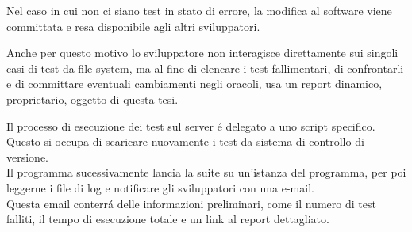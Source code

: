             Nel caso in cui non ci siano test in stato di errore, la modifica al software viene committata e resa disponibile agli altri sviluppatori.
            
            Anche per questo motivo lo sviluppatore non interagisce direttamente sui singoli casi di test da file system,
            ma al fine di elencare i test fallimentari, di confrontarli e di committare eventuali cambiamenti negli oracoli, usa un report dinamico, 
            proprietario, oggetto di questa tesi.

            Il processo di esecuzione dei test sul server \'e delegato a uno script specifico.\\ 
            Questo si occupa di scaricare nuovamente i test da sistema di controllo di versione.\\
            Il programma sucessivamente lancia la suite su un'istanza del programma, per poi leggerne i file di log e notificare gli sviluppatori con una e-mail.\\
            Questa email conterr\'a delle informazioni preliminari, come il numero di test falliti, il tempo di esecuzione totale e un link al report dettagliato.
